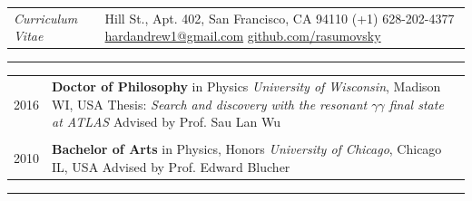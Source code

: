 \documentclass{letter}
\begin{document}
 

\begin{tabular}{p{}p{}}
	\hfill \newline \href{https://ch.linkedin.com/in/andrew-hard-25b690a5}{\Huge{\color{Maroon}{Andrew Hard}}} \newline \LARGE{\textit{Curriculum Vitae}} \newline
	&
	\hfill \newline 1 Hill St., Apt. 402, San Francisco, CA 94110 \newline
	(+1) 628-202-4377 \newline
	\href{mailto:hardandrew1@gmail.com}{hardandrew1@gmail.com} \newline
	\href{https://github.com/rasumovsky}{github.com/rasumovsky}\\
\end{tabular}

\begin{flushleft}
\Large{\textsc{\textbf{\color{Maroon}{Education}}}}
\vspace{1pt} %
\hrule
\end{flushleft}

\begin{tabular}{p{}p{}}
	2016
	&
	\textbf{Doctor of Philosophy} in Physics \newline 
	\textit{University of Wisconsin}, Madison WI, USA \newline
	Thesis: \textit{Search and discovery with the resonant $\gamma\gamma$ final state at ATLAS} \newline
	Advised by Prof. Sau Lan Wu \\
\\
	2010 
	& 
	\textbf{Bachelor of Arts} in Physics, Honors \newline 
	\textit{University of Chicago}, Chicago IL, USA \newline
	Advised by Prof. Edward Blucher 
\\
\end{tabular}

\begin{flushleft}
\Large{\textsc{\textbf{\color{Maroon}{Experience}}}}
\vspace{1pt} %
\hrule
\end{flushleft}
\end{document}
